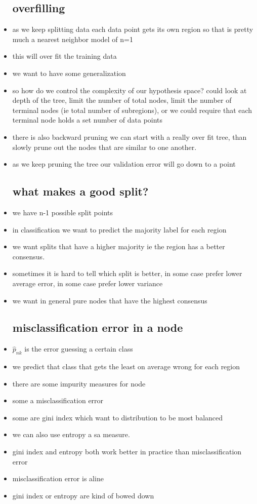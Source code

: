 \documentclass{article}
\begin{document}
\begin{itemize}
\subsection*{overfilling}
\item as we keep splitting data each data point gets its own region so that is pretty much a nearest neighbor model of n=1
\item this will over fit the training data
\item we want to have some generalization 
\item so how do we control the complexity of our hypothesis space? could look at depth of the tree, limit the number of total nodes, limit the number of terminal nodes (ie total number of subregions), or we could require that each terminal node holds a set number of data points
\item there is also backward pruning we can start with a really over fit tree, than slowly prune out the nodes that are similar to one another. 
\item as we keep pruning the tree our validation error will go down to a point 
\subsection*{what makes a good split?}
\item we have n-1 possible split points 
\item in classification we want to predict the majority label for each region
\item we want splits that have a higher majority ie the region has a better consensus. 
\item sometimes it is hard to tell which split is better, in some case prefer lower average error, in some case prefer lower variance
\item we want in general pure nodes that have the highest consensus
\subsection*{misclassification error in a node}
\item $\hat{p}_{nk}$ is the error guessing a certain class 
\item we predict that class that gets the least on average wrong for each region 
\item there are some impurity measures for node 
\item some a misclassification error
\item some are gini index which want to distribution to be most balanced
\item we can also use entropy a sa measure.  
\item gini index and entropy both work better in practice than misclassification error 
\item misclassification error is  aline 
\item gini index or entropy are kind of bowed down 

\end{itemize}
\end{document}
